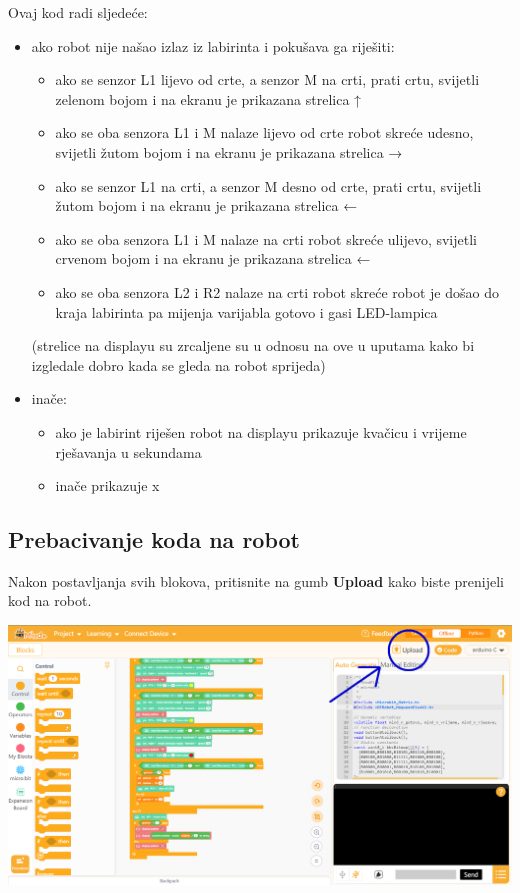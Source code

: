 \vspace{3mm}

Ovaj kod radi sljedeće:

\begin{itemize}
    \item ako robot nije našao izlaz iz labirinta i pokušava ga riješiti:
    \begin{itemize}
        \item ako se senzor L1 lijevo od crte, a senzor M na crti, prati crtu, svijetli zelenom bojom i na ekranu je prikazana strelica ↑
        \item ako se oba senzora L1 i M nalaze lijevo od crte robot skreće udesno, svijetli žutom bojom i na ekranu je prikazana strelica →
        \item ako se senzor L1 na crti, a senzor M desno od crte, prati crtu, svijetli žutom bojom i na ekranu je prikazana strelica ←
        \item ako se oba senzora L1 i M nalaze na crti robot skreće ulijevo, svijetli crvenom bojom i na ekranu je prikazana strelica ←
        \item ako se oba senzora L2 i R2 nalaze na crti robot skreće robot je došao do kraja labirinta pa mijenja varijabla gotovo i gasi LED-lampica
    \end{itemize}
    (strelice na displayu su zrcaljene su u odnosu na ove u uputama kako bi izgledale dobro kada se gleda na robot sprijeda)
    \item inače:
    \begin{itemize}
        \item ako je labirint riješen robot na displayu prikazuje kvačicu i vrijeme rješavanja u sekundama
        \item inače prikazuje x
    \end{itemize}
\end{itemize}



\subsection{Prebacivanje koda na robot}

Nakon postavljanja svih blokova, pritisnite na gumb \textbf{Upload} kako biste prenijeli kod na robot.

\vspace{3mm}

\includegraphics[scale=0.3]{Rjesenje10.png}

